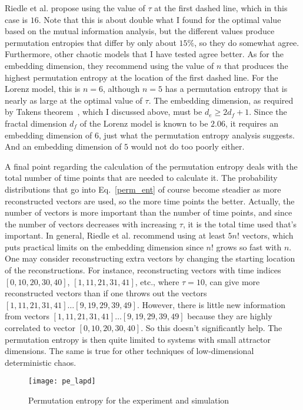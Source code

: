 Riedle et al. propose using the value of $\tau$ at the first dashed line, which in this case is $16$. Note that this is about double what I found for the optimal value based on the mutual information
analysis, but the different values produce permutation entropies that differ by only about $15\%$, so they do somewhat agree. Furthermore, other chaotic models that I have tested agree better.
As for the embedding dimension, they recommend using the value of $n$ that produces the highest permutation entropy at the location of the first dashed line. For the Lorenz model, this is
$n=6$, although $n=5$ has a permutation entropy that is nearly as large at the optimal value of $\tau$. The embedding dimension, as required by Takens theorem~\cite{takens1981}, which I discussed
above, must be $d_e \ge 2 d_f + 1$. Since the fractal dimension $d_f$ of the Lorenz model is known to be $2.06$, it requires an embedding dimension of $6$, just what the permutation entropy
analysis suggests. And an embedding dimension of $5$ would not do too poorly either.

A final point regarding the calculation of the permutation entropy deals with the total number of time points that are needed to calculate it. The probability distributions that go into
Eq.~\ref{perm_ent} of course become steadier as more reconstructed vectors are used, so the more time points the better. Actually, the number of vectors is more important than the number
of time points, and since the number of vectors decreases with increasing $\tau$, it is the total time used that's important. In general, Riedle et al. recommend using at least $5 n!$
vectors, which puts practical limits on the embedding dimension since $n!$ grows so fast with $n$. One may consider reconstructing extra vectors by changing the starting location of
the reconstructions. For instance, reconstructing vectors with time indices $[0,10,20,30,40]$, $[1,11,21,31,41]$, etc., where $\tau=10$, can give more reconstructed vectors than if one
throws out the vectors $[1,11,21,31,41] \ldots [9,19,29,39,49]$. However, there is little new information from vectors $[1,11,21,31,41] \ldots [9,19,29,39,49]$ because they are
highly correlated to vector $[0,10,20,30,40]$. So this doesn't significantly help. The permutation entropy is then quite limited to systems with small attractor
dimensions. The same is true for other techniques of low-dimensional deterministic chaos.

\begin{figure}[!ht]
\centerline{\texttt{[image: pe\_lapd]}}
\caption{Permutation entropy for the experiment and simulation}
\label{pe_lapd}
\end{figure}

